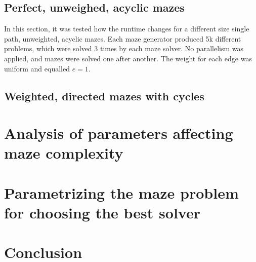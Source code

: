 \subsection{Perfect, unweighed, acyclic mazes}
In this section, it was tested how the runtime changes for a different size single path, unweighted, acyclic mazes. Each maze generator produced 5k different problems, which were solved 3 times by each
maze solver. No parallelism was applied, and mazes were solved one after another. The weight for each edge was uniform and equalled $e = 1$.
\subsection{Weighted, directed mazes with cycles}
\section{Analysis of parameters affecting maze complexity}
\section{Parametrizing the maze problem for choosing the best solver}
\section{Conclusion}
